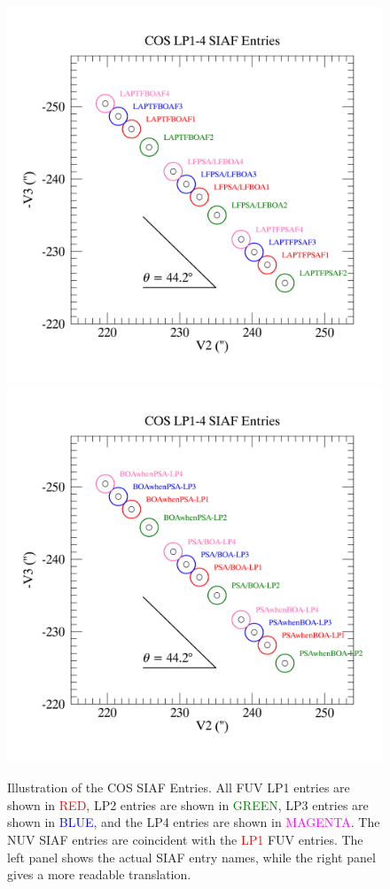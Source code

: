 \begin{figure}[htb]
\noindent\includegraphics*[width=0.485\linewidth]{png/LP4_SIAF_positions.png}
\noindent\includegraphics*[width=0.485\linewidth]{png/LP4_SIAF_positions_sname.png}
\caption[Illustration of COS SIAF Entries]{
Illustration of the COS SIAF Entries.  All FUV LP1 entries are shown in \textcolor{RED}{RED},
LP2 entries are shown in \textcolor{GREEN}{GREEN}, LP3 entries are shown in \textcolor{BLUE}{BLUE},
and the LP4 entries are shown in \textcolor{MAGENTA}{MAGENTA}.
The NUV SIAF entries are coincident with the \textcolor{RED}{LP1} FUV entries.
The left panel shows the actual SIAF entry names, while the right panel gives a more readable translation.\label{fig:SIAF1}}
\end{figure}

